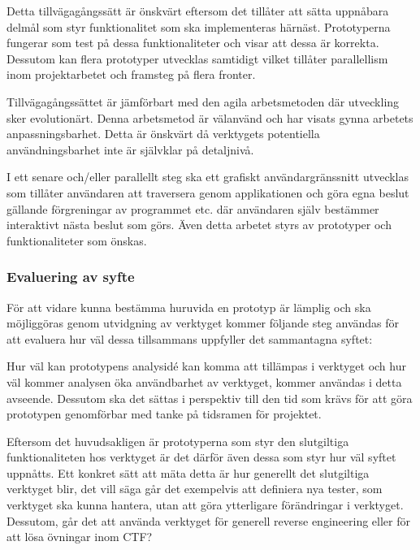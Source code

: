 Detta tillvägagångssätt är önskvärt eftersom det tillåter att sätta uppnåbara delmål som styr
funktionalitet som ska implementeras härnäst. Prototyperna fungerar som test på dessa
funktionaliteter och visar att dessa är korrekta. Dessutom kan flera prototyper 
utvecklas samtidigt vilket tillåter parallellism inom projektarbetet och
framsteg på flera fronter.

Tillvägagångssättet är jämförbart med den agila arbetsmetoden där utveckling sker 
evolutionärt. Denna arbetsmetod är välanvänd och har visats gynna arbetets
anpassningsbarhet\cite{agile}. Detta är önskvärt då verktygets potentiella 
användningsbarhet inte är självklar på detaljnivå.

I ett senare och/eller parallellt steg ska ett grafiskt användargränssnitt
utvecklas som tillåter användaren att traversera genom applikationen och göra
egna beslut gällande förgreningar av programmet etc. där användaren själv
bestämmer interaktivt nästa beslut som görs. Även detta arbetet styrs av
prototyper och funktionaliteter som önskas.

\subsubsection{Evaluering av syfte}

För att vidare kunna bestämma huruvida en prototyp är lämplig och ska möjliggöras
genom utvidgning av verktyget kommer följande steg användas för att evaluera hur
väl dessa tillsammans uppfyller det sammantagna syftet:

Hur väl kan prototypens analysidé kan komma att tillämpas i verktyget och hur
väl kommer analysen öka användbarhet av verktyget, kommer användas i detta
avseende. Dessutom ska det sättas i perspektiv till den tid som krävs för att
göra prototypen genomförbar med tanke på tidsramen för projektet.

Eftersom det huvudsakligen är prototyperna som styr den slutgiltiga
funktionaliteten hos verktyget är det därför även dessa som styr hur väl syftet
uppnåtts. Ett konkret sätt att mäta detta är hur generellt det slutgiltiga
verktyget blir, det vill säga går det exempelvis att definiera nya tester, som verktyget
ska kunna hantera, utan att göra ytterligare förändringar i verktyget. Dessutom,
går det att använda verktyget för generell reverse engineering eller för att lösa övningar
inom CTF?




%
